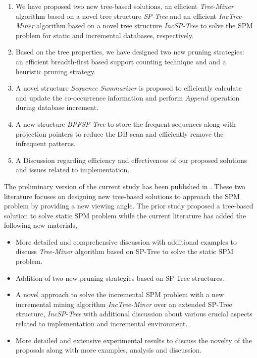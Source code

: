 \begin{enumerate}
    \item We have proposed two new tree-based solutions, an efficient \textit{Tree-Miner} algorithm based on a novel tree structure \textit{SP-Tree} and an efficient \textit{IncTree-Miner} algorithm based on a novel tree structure \textit{IncSP-Tree} to solve the SPM problem for static and incremental databases, respectively.
    \item Based on the tree properties, we have designed two new pruning strategies: an efficient breadth-first based support counting technique and and a heuristic pruning strategy.
    \item A novel structure \textit{Sequence Summarizer} is proposed to efficiently calculate and update the co-occurrence information and perform $Append$ operation during database increment.
    \item A new structure \textit{BPFSP-Tree} to store the frequent sequences along with projection pointers to reduce the DB scan and efficiently remove the infrequent patterns.
    \item A Discussion regarding efficiency and effectiveness of our proposed solutions and issues related to implementation.
\end{enumerate}

The preliminary version of the current study has been published in \cite{rizvee2020tree}. These two literature focuses on designing new tree-based solutions to approach the SPM problem by providing a new viewing angle. The prior study proposed a tree-based solution to solve static SPM problem while the current literature has added the following new materials, 

\begin{itemize}
    \item More detailed and comprehensive discussion with additional examples to discuss \textit{Tree-Miner} algorithm based on SP-Tree to solve the static SPM problem.
    \item Addition of two new pruning strategies based on SP-Tree structures. 
    \item A novel approach to solve the incremental SPM problem with a new incremental mining algorithm \textit{IncTree-Miner} over an extended SP-Tree structure, \textit{IncSP-Tree} with additional discussion about various crucial aspects related to implementation and incremental environment. 
    \item More detailed and extensive experimental results to discuss the novelty of the proposals along with more examples, analysis and discussion.
\end{itemize}

